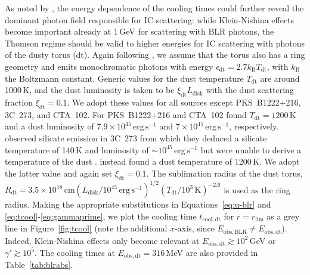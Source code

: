 \documentclass[twocolumn]{aastex62}
\begin{document}
  
As noted by \citet{2012ApJ...758L..15D}, the energy dependence of the cooling times could  further reveal the dominant photon field responsible for IC scattering: while Klein-Nishina effects become important already at 1\,GeV for scattering with BLR photons, the Thomson regime should be valid to higher energies for IC scattering with photons of the dusty torus (dt). 
Again following \citet{finke2016}, we assume that the torus also has a ring geometry and emits monochromatic photons with energy $\epsilon_\mathrm{dt} = 2.7 k_\mathrm{B} T_\mathrm{dt}$, with $k_\mathrm{B}$ the Boltzmann constant.
Generic values for the dust temperature $T_\mathrm{dt}$ are around 1000\,K, and the dust luminosity is taken to be $\xi_\mathrm{dt}L_\mathrm{disk}$ with the dust scattering fraction $\xi_\mathrm{dt} = 0.1$.
We adopt these values for all sources except 
 PKS~B1222+216, 3C~273, and CTA~102. 
 For PKS~B1222+216 and CTA~102  \citet{2011ApJ...732..116M} found $T_\mathrm{dt} = 1200\,$K and a dust luminosity of $7.9\times10^{45}\,\mathrm{erg}\,\mathrm{s}^{-1}$ and $7\times10^{45}\,\mathrm{erg}\,\mathrm{s}^{-1}$, respectively. 
\citet{2005ApJ...625L..75H} observed silicate emission in 3C~273 from which they deduced a silicate temperature of 140\,K and luminosity of $\sim 10^{45}\,\mathrm{erg}\,\mathrm{s}^{-1}$ but were unable to derive a temperature of the dust \citep[see also the discussion in][]{2011ApJ...732..116M}. \citet{2008A&A...486..411S} instead found a dust temperature of 1200\,K.
We adopt the latter value and again set $\xi_\mathrm{dt} = 0.1$.
The sublimation radius of the dust torus, $R_\mathrm{dt} = 3.5\times10^{18}\,\mathrm{cm}(L_\mathrm{disk}/10^{45}\,\mathrm{erg}\,\mathrm{s}^{-1})^{1/2}(T_\mathrm{dt}/10^3\,\mathrm{K})^{-2.6}$ is used as the ring radius. 
Making the appropriate substitutions in Equations~\ref{eq:u-blr} and \ref{eq:tcool}-\ref{eq:gammaprime}, we plot the cooling time $t_\mathrm{cool,dt}$ for $r = r_\mathrm{lim}$ as a grey line in Figure~\ref{fig:tcool} (note the additional $x$-axis, since $E_\mathrm{obs, BLR} \neq E_\mathrm{obs,dt}$). 
Indeed, Klein-Nishina effects only become relevant at $E_\mathrm{obs,dt} \gtrsim 10^2\,$GeV or $\gamma' \gtrsim 10^5$. The cooling times at $E_\mathrm{obs,dt} = 316\,$MeV are also provided in Table~\ref{tab:blrabs}.
\end{document}
